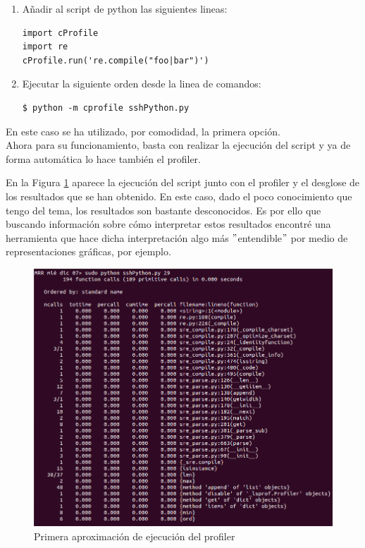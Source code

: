 \begin{enumerate}
	\item Añadir al script de python las siguientes lineas:
\begin{lstlisting}[style=cmas]
import cProfile
import re
cProfile.run('re.compile("foo|bar")')
\end{lstlisting}
		
	\item Ejecutar la siguiente orden desde la linea de comandos:
\begin{lstlisting}[style=fich]
$ python -m cprofile sshPython.py
\end{lstlisting}
\end{enumerate}

En este caso se ha utilizado, por comodidad, la primera opción.
\\

Ahora para su funcionamiento, basta con realizar la ejecución del script y ya de forma automática lo hace también el profiler.

En la Figura \ref{fig:figura82} aparece la ejecución del script junto con el profiler y el desglose de los resultados que se han obtenido.
En este caso, dado el poco conocimiento que tengo del tema, los resultados son bastante desconocidos. Es por ello que buscando información sobre cómo interpretar estos resultados encontré una herramienta que hace dicha interpretación algo más $ " $entendible$ " $ por medio de representaciones gráficas, por ejemplo.

\begin{figure}[H]
	\centering
	\includegraphics[scale=0.6]{figuras/ejercicio8/figura2.png} 
	\caption{Primera aproximación de ejecución del profiler} 
	\label{fig:figura82}
\end{figure}

